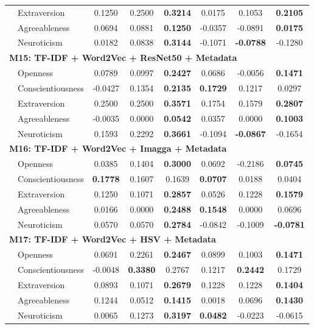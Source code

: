 \begin{longtable}{llcccccc}
& Extraversion & 0.1250 & 0.2500 & \textbf{0.3214} & 0.0175 & 0.1053 & \textbf{0.2105} \\
& Agreeableness & 0.0694 & 0.0881 & \textbf{0.1250} & -0.0357 & -0.0891 & \textbf{0.0175} \\
& Neuroticism & 0.0182 & 0.0838 & \textbf{0.3144} & -0.1071 & \textbf{-0.0788} & -0.1280 \\
\hline
\multicolumn{8}{l}{\textbf{M15: TF-IDF + Word2Vec + ResNet50 + Metadata}} \\
& Openness & 0.0789 & 0.0997 & \textbf{0.2427} & 0.0686 & -0.0056 & \textbf{0.1471} \\
& Conscientiousness & -0.0427 & 0.1354 & \textbf{0.2135} & \textbf{0.1729} & 0.1217 & 0.0297 \\
& Extraversion & 0.2500 & 0.2500 & \textbf{0.3571} & 0.1754 & 0.1579 & \textbf{0.2807} \\
& Agreeableness & -0.0035 & 0.0000 & \textbf{0.0542} & 0.0357 & 0.0000 & \textbf{0.1003} \\
& Neuroticism & 0.1593 & 0.2292 & \textbf{0.3661} & -0.1094 & \textbf{-0.0867} & -0.1654 \\
\hline
\multicolumn{8}{l}{\textbf{M16: TF-IDF + Word2Vec + Imagga + Metadata}} \\
& Openness & 0.0385 & 0.1404 & \textbf{0.3000} & 0.0692 & -0.2186 & \textbf{0.0745} \\
& Conscientiousness & \textbf{0.1778} & 0.1607 & 0.1639 & \textbf{0.0707} & 0.0188 & 0.0404 \\
& Extraversion & 0.1250 & 0.1071 & \textbf{0.2857} & 0.0526 & 0.1228 & \textbf{0.1579} \\
& Agreeableness & 0.0166 & 0.0000 & \textbf{0.2488} & \textbf{0.1548} & 0.0000 & 0.0696 \\
& Neuroticism & 0.0570 & 0.0570 & \textbf{0.2784} & -0.0842 & -0.1009 & \textbf{-0.0781} \\
\hline
\multicolumn{8}{l}{\textbf{M17: TF-IDF + Word2Vec + HSV + Metadata}} \\
& Openness & 0.0691 & 0.2261 & \textbf{0.2467} & 0.0899 & 0.1003 & \textbf{0.1471} \\
& Conscientiousness & -0.0048 & \textbf{0.3380} & 0.2767 & 0.1217 & \textbf{0.2442} & 0.1729 \\
& Extraversion & 0.0893 & 0.1071 & \textbf{0.2679} & 0.1228 & 0.1228 & \textbf{0.1404} \\
& Agreeableness & 0.1244 & 0.0512 & \textbf{0.1415} & 0.0018 & 0.0696 & \textbf{0.1430} \\
& Neuroticism & 0.0065 & 0.1273 & \textbf{0.3197} & \textbf{0.0482} & -0.0223 & -0.0615 \\

\end{longtable}
